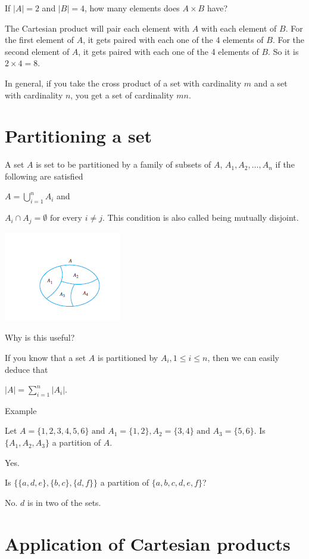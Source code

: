 \documentclass[12pt]{article}
\begin{document}
If $|A| = 2$ and $|B| = 4$, how many elements does $A \times B$ have?

The Cartesian product will pair each element with $A$ with each element of $B$. For the first element of $A$, it gets paired with each one of the 4 elements of $B$. For the second element of $A$, it gets paired with each one of the 4 elements of $B$. So it is $ 2 \times 4 = 8$.

In general, if you take the cross product of a set with cardinality $m$ and a set with cardinality $n$, you get a set of cardinality $mn$.

\section*{Partitioning a set}

A set $A$ is set to be partitioned by a family of subsets of $A$, $A_1, A_2, \ldots, A_n$ if the following are satisfied

$\displaystyle A = \bigcup_{i=1}^n A_i$ and

$\displaystyle A_i \cap A_j = \emptyset \text{ for every } i \neq j$. This condition is also called being mutually disjoint.

\includegraphics{partition.png}

Why is this useful?

If you know that a set $A$ is partitioned by $A_i, 1 \le i \le n$, then we can easily deduce that

$\displaystyle |A| = \sum_{i=1}^n |A_i|$.

Example

Let $A = \{1,2,3,4,5,6\} \text{ and } A_1 = \{1,2\}, A_2 = \{3,4\} \text{ and } A_3 = \{5,6\}$. Is $\{A_1, A_2, A_3\}$ a partition of $A$.

Yes. 

Is $\{\{a,d,e\},\{b,c\},\{d,f\}\}$ a partition of $\{a,b,c,d,e,f\}$?

No. $d$ is in two of the sets.



\section*{Application of Cartesian products}
\end{document}
